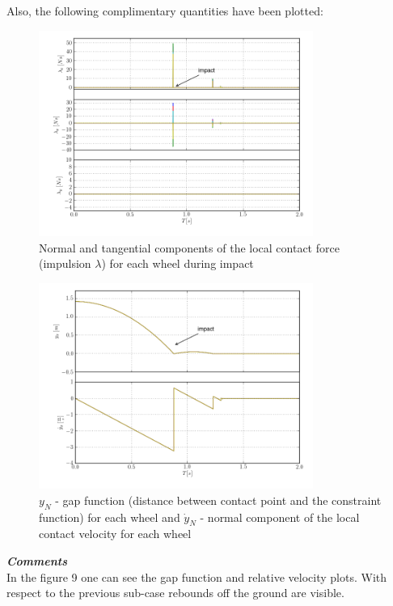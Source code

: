 \noindent Also, the following complimentary quantities have been plotted:

\begin{figure}[H]
  \centering
    \includegraphics[width=0.8\textwidth]{lambdaNTSrest}
  \caption{Normal and tangential components of the local contact force (impulsion $\lambda$) for each wheel during impact}
\end{figure}

\begin{figure}[H]
  \centering
    \includegraphics[width=0.8\textwidth]{yNyNdotrest}
  \caption{$y_{N}$ - gap function (distance between contact point and the constraint function) for each wheel and $\dot{y}_{N}$ - normal component of the local contact velocity for each wheel}
\end{figure}

\noindent \textbf{\textit{\Large{Comments}}}\\[1mm]
\noindent In the figure 9 one can see the gap function and relative velocity plots. With respect to the previous sub-case rebounds off the ground are visible.\\ 


